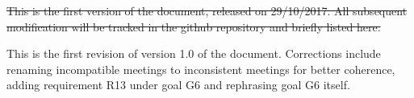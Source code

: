 \st{This is the first version of the document, released on 29/10/2017.
All subsequent modification will be tracked in the github repository and briefly listed here.}

This is the first revision of version 1.0 of the document. Corrections include renaming incompatible meetings to inconsistent meetings for better coherence, adding requirement R13 under goal G6 and rephrasing goal G6 itself.